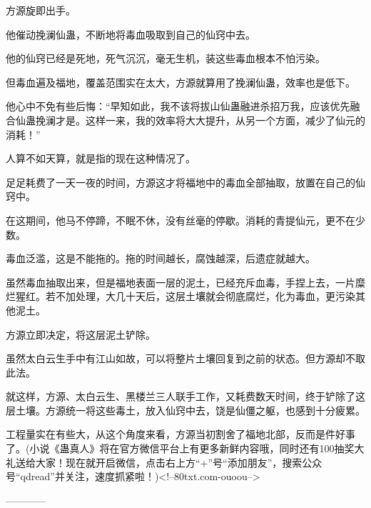 \begin{this_body}
方源旋即出手。

他催动挽澜仙蛊，不断地将毒血吸取到自己的仙窍中去。

他的仙窍已经是死地，死气沉沉，毫无生机，装这些毒血根本不怕污染。

但毒血遍及福地，覆盖范围实在太大，方源就算用了挽澜仙蛊，效率也是低下。

他心中不免有些后悔：“早知如此，我不该将拔山仙蛊融进杀招万我，应该优先融合仙蛊挽澜才是。这样一来，我的效率将大大提升，从另一个方面，减少了仙元的消耗！”

人算不如天算，就是指的现在这种情况了。

足足耗费了一天一夜的时间，方源这才将福地中的毒血全部抽取，放置在自己的仙窍中。

在这期间，他马不停蹄，不眠不休，没有丝毫的停歇。消耗的青提仙元，更不在少数。

毒血泛滥，这是不能拖的。拖的时间越长，腐蚀越深，后遗症就越大。

虽然毒血抽取出来，但是福地表面一层的泥土，已经充斥血毒，手捏上去，一片糜烂猩红。若不加处理，大几十天后，这层土壤就会彻底腐烂，化为毒血，更污染其他泥土。

方源立即决定，将这层泥土铲除。

虽然太白云生手中有江山如故，可以将整片土壤回复到之前的状态。但方源却不取此法。

就这样，方源、太白云生、黑楼兰三人联手工作，又耗费数天时间，终于铲除了这层土壤。方源统一将这些毒土，放入仙窍中去，饶是仙僵之躯，也感到十分疲累。

工程量实在有些大，从这个角度来看，方源当初割舍了福地北部，反而是件好事了。(小说《蛊真人》将在官方微信平台上有更多新鲜内容哦，同时还有100抽奖大礼送给大家！现在就开启微信，点击右上方“+”号“添加朋友”，搜索公众号“qdread”并关注，速度抓紧啦！)<!--80txt.com-ouoou-->

------------

\end{this_body}

